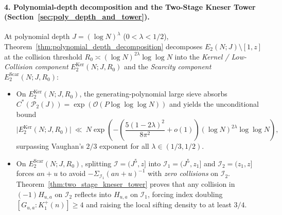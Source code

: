 \documentclass[11pt, a4paper]{article}
\theoremstyle{plain}
\theoremstyle{definition}
\begin{document}
\paragraph{4. Polynomial-depth decomposition and the Two-Stage Kneser Tower (Section~\ref{sec:poly_depth_and_tower}).}
At polynomial depth $J=(\log N)^{\lambda}$ ($0<\lambda<1/2$), Theorem~\ref{thm:polynomial_depth_decomposition} decomposes $E_2(N;J)\setminus[1,z]$ at the collision threshold $R_0\asymp(\log N)^{2\lambda}\log\log N$ into the \emph{Kernel / Low-Collision component} $E_2^{\mathrm{Ker}}(N;J,R_0)$ and the \emph{Scarcity component} $E_2^{\mathrm{Scar}}(N;J,R_0)$:
\begin{itemize}
    \item On $E_2^{\mathrm{Ker}}(N;J,R_0)$, the gen\-er\-at\-ing-poly\-no\-mial large sieve absorbs\linebreak $C^{\ast}(\mathcal{P}_2(J))=\exp(\mathcal{O}(P\log\log\log N))$ and yields the unconditional bound
    \[
    \big|E_2^{\mathrm{Ker}}(N;J,R_0)\big|\ \ll\ N\exp\!\left(-\left(\frac{5(1-2\lambda)^{2}}{8\pi^{2}}+o(1)\right)(\log N)^{2\lambda}\log\log N\right),
    \]
    surpassing Vaughan's $2/3$ exponent for all $\lambda\in(1/3,1/2)$.
    \item On $E_2^{\mathrm{Scar}}(N;J,R_0)$, splitting $\mathcal{I}=(J^{5},z]$ into $\mathcal{I}_1=(J^{5},z_1]$ and $\mathcal{I}_2=(z_1,z]$ forces $an+u$ to avoid $-\Sigma_{\mathcal{I}_1}(an+u)^{-1}$ with \emph{zero collisions} on $\mathcal{I}_2$. Theorem~\ref{thm:two_stage_kneser_tower} proves that any collision in $(-1)H_{u,a}$ on $\mathcal{I}_2$ reflects into $H_{u,a}$ on $\mathcal{I}_1$, forcing index doubling $[G_{u,a}:K_1^{+}(n)]\ge 4$ and raising the local sifting density to at least $3/4$.
\end{itemize}
\end{document}
